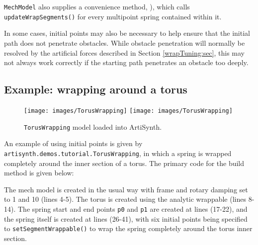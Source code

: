 \begin{sideblock}
{\tt MechModel} also supplies a convenience method, ), which calls {\tt updateWrapSegments()}
for every multipoint spring contained within it.
\end{sideblock}

\begin{sideblock}
In some cases, initial points may also be necessary to help ensure
that the initial path does not penetrate obstacles. While obstacle
penetration will normally be resolved by the artificial forces
described in Section \ref{wrapTuning:sec}, this may not always work
correctly if the starting path penetrates an obstacle too deeply.
\end{sideblock}

\subsection{Example: wrapping around a torus}
\label{TorusWrapping:sec}

\begin{figure}[ht]
\begin{center}
\iflatexml
 \texttt{[image: images/TorusWrapping]}
\else
 \texttt{[image: images/TorusWrapping]}
\fi
\end{center}
\caption{{\tt TorusWrapping} model loaded into ArtiSynth.}
\label{TorusWrapping:fig}
\end{figure}

An example of using initial points is given by {\tt
artisynth.demos.tutorial.TorusWrapping}, in which a spring
is wrapped completely around the inner section of a torus.
The primary code for
the build method is given below: 
\lstset{numbers=left}
\iflatexml

\else

\fi
\lstset{numbers=none}

The mech model is created in the usual way with frame and rotary
damping set to 1 and 10 (lines 4-5). The torus is created using the
analytic wrappable  (lines 8-14). The
spring start and end points {\tt p0} and {\tt p1} are created at lines
(17-22), and the spring itself is created at lines (26-41), with six
initial points being specified to {\tt setSegmentWrappable()} to wrap
the spring completely around the torus inner section.

